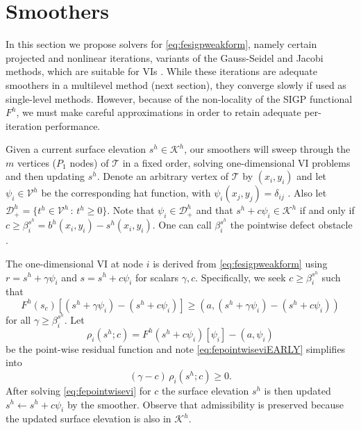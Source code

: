 \documentclass[letterpaper,final,12pt,reqno]{amsart}
\theoremstyle{claim}
\newcommand{\ip}[2]{\left(#1,#2\right)}
\numberwithin{equation}{section}
\numberwithin{figure}{section}
\numberwithin{table}{section}
\numberwithin{theorem}{section}
\begin{document}
\section{Smoothers} \label{sec:smoothers}

In this section we propose solvers for \eqref{eq:fesigpweakform}, namely certain projected and nonlinear iterations, variants of the Gauss-Seidel and Jacobi methods, which are suitable for VIs \cite{KinderlehrerStampacchia1980}.  While these iterations are adequate smoothers in a multilevel method (next section), they converge slowly if used as single-level methods.  However, because of the non-locality of the SIGP functional $F^h$, we must make careful approximations in order to retain adequate per-iteration performance.

Given a current surface elevation $s^h\in \mathcal{K}^h$, our smoothers will sweep through the $m$ vertices ($P_1$ nodes) of $\mathcal{T}$ in a fixed order, solving one-dimensional VI problems and then updating $s^h$.   Denote an arbitrary vertex of $\mathcal{T}$ by $(x_i,y_i)$ and let $\psi_i \in \mathcal{V}^h$ be the corresponding hat function, with $\psi_i(x_j,y_j)=\delta_{ij}$ \cite{Elmanetal2014}.  Also let $\mathcal{D}_+^h = \{t^h \in \mathcal{V}^h \,:\, t^h \ge 0\}$.  Note that $\psi_i \in \mathcal{D}_+^h$ and that $s^h + c \psi_i \in \mathcal{K}^h$ if and only if $c\ge \beta_i^{s^h} = b^h(x_i,y_i) - s^h(x_i,y_i)$.  One can call $\beta_i^{s^h}$ the pointwise defect obstacle \cite{GraeserKornhuber2009}.

The one-dimensional VI at node $i$ is derived from \eqref{eq:fesigpweakform} using $r = s^h+\gamma \psi_i$ and $s = s^h+c \psi_i$ for scalars $\gamma,c$.  Specifically, we seek $c \ge \beta_i^{s^h}$ such that
\begin{equation}
F^h(s_c)[(s^h+\gamma \psi_i) - (s^h+c \psi_i)] \ge \ip{a}{(s^h+\gamma \psi_i) - (s^h+c \psi_i)} \label{eq:fepointwiseviEARLY}
\end{equation}
for all $\gamma \ge \beta_i^{s^h}$.  Let
\begin{equation}
\rho_i(s^h; c) = F^h(s^h+c\psi_i)[\psi_i] - \ip{a}{\psi_i} \label{eq:ferhoi}
\end{equation}
be the point-wise residual function and note \eqref{eq:fepointwiseviEARLY} simplifies into
\begin{equation}
(\gamma - c) \,\rho_i(s^h; c) \ge 0. \label{eq:fepointwisevi}
\end{equation}
After solving \eqref{eq:fepointwisevi} for $c$ the surface elevation $s^h$ is then updated $s^h \gets s^h + c \psi_i$ by the smoother.  Observe that admissibility is preserved because the updated surface elevation is also in $\mathcal{K}^h$.
\end{document}
